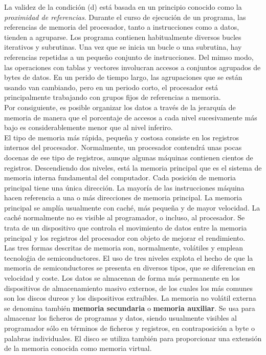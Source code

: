 \documentclass{article}
\begin{document}
		La validez de la condición (d) está basada en un principio conocido como la \textit{proximidad de referencias}. Durante el curso de ejecución de un programa, las referencias de memoria del procesador, tanto a instrucciones como a datos, tienden a agruparse. Los programa contienen habitualmente diversos bucles iterativos y subrutinas. Una vez que se inicia un bucle o una subrutina, hay referencias repetidas a un pequeño conjunto de instrucciones. Del mimso modo, las operaciones con tablas y vectores involucran accesos a conjuntos agrupados de bytes de datos. En un perido de tiempo largo, las agrupaciones que se están usando van cambiando, pero en un periodo corto, el procesador está principalmente trabajando con grupos fijos de referencias a memoria. \\
		
		Por consiguiente, es posible organizar los datos a través de la jerarquía de memoria de manera que el porcentaje de accesos a cada nivel sucesivamente más bajo es considerablemente menor que al nivel inferiro. \\
		
		El tipo de memoria más rápida, pequeña y costosa consiste en los registros internos del procesador. Normalmente, un procesador contendrá unas pocas docenas de ese tipo de registros, aunque algunas máquinas contienen cientos de registros. Descendiendo dos niveles, está la memoria principal que es el sistema de memoria interna fundamental del computador. Cada posición de memoria principal tiene una única dirección. La mayoría de las instrucciones máquina hacen referencia a una o más direcciones de memoria principal. La memoria principal se amplía usualmente con caché, más pequeña y de mayor velocidad. La caché normalmente no es visible al programador, o incluso, al procesador. Se trata de un dispositivo que controla el movimiento de datos entre la memoria principal y los registros del procesador con objeto de mejorar el rendimiento. \\
		
		Las tres formas descritas de memoria son, normalmente, volátiles y emplean tecnoloǵia de semiconductores. El uso de tres niveles explota el hecho de que la memoria de semiconductores se presenta en diversos tipos, que se diferencian en velocidad y coste. Los datos se almacenan de forma más permanente en los dispositivos de almacenamiento masivo externos, de los cuales los más comunes son los discos dureos y los dispositivos extraíbles. La memoria no volátil externa se denomina también \textbf{memoria secundaria} o \textbf{memoria auxiliar}. Se usa para almacenar los ficheros de programas y datos, siendo usualmente visibles al programador sólo en términos de ficheros y registros, en contraposición a byte o palabras individuales. El disco se utiliza también para proporcionar una extensión de la memoria conocida como memoria virtual.  \\
		
\end{document}
